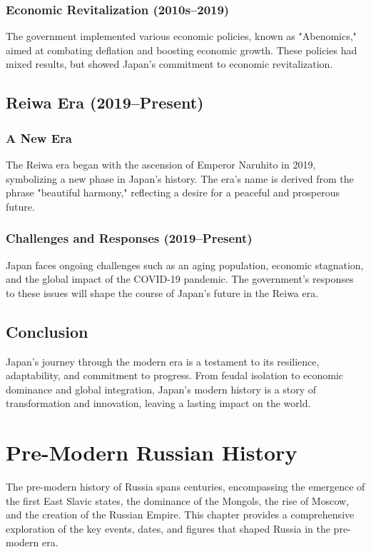 \documentclass[a4paper,12pt]{book}
\begin{document}
\subsection{Economic Revitalization (2010s–2019)}
The government implemented various economic policies, known as "Abenomics," aimed at combating deflation and boosting economic growth. These policies had mixed results, but showed Japan’s commitment to economic revitalization.

\section{Reiwa Era (2019–Present)}
\label{sec:reiwa-era}
\subsection{A New Era}
The Reiwa era began with the ascension of Emperor Naruhito in 2019, symbolizing a new phase in Japan’s history. The era's name is derived from the phrase "beautiful harmony," reflecting a desire for a peaceful and prosperous future.

\subsection{Challenges and Responses (2019–Present)}
Japan faces ongoing challenges such as an aging population, economic stagnation, and the global impact of the COVID-19 pandemic. The government’s responses to these issues will shape the course of Japan’s future in the Reiwa era.

\section{Conclusion}
\label{sec:conclusion-modern-japan}
Japan’s journey through the modern era is a testament to its resilience, adaptability, and commitment to progress. From feudal isolation to economic dominance and global integration, Japan’s modern history is a story of transformation and innovation, leaving a lasting impact on the world.

\chapter{Pre-Modern Russian History}
\label{ch:pre-modern-russian-history}

The pre-modern history of Russia spans centuries, encompassing the emergence of the first East Slavic states, the dominance of the Mongols, the rise of Moscow, and the creation of the Russian Empire. This chapter provides a comprehensive exploration of the key events, dates, and figures that shaped Russia in the pre-modern era.
\end{document}
